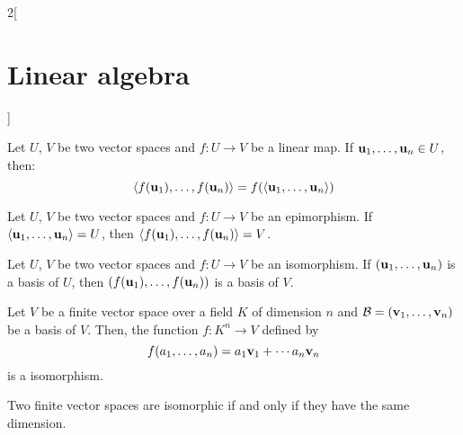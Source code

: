 \documentclass[../../../main.tex]{subfiles}
\begin{document}
\begin{multicols}{2}[\section{Linear algebra}]
\begin{proposition}
  \end{proposition}
  \begin{lemma}
    Let $U$, $V$ be two vector spaces and $f:U\rightarrow V$ be a linear map. If $\boldsymbol{\mathrm{u}}_1,\ldots,\boldsymbol{\mathrm{u}}_n\in U$, then: $$\langle f(\boldsymbol{\mathrm{u}}_1),\ldots,f(\boldsymbol{\mathrm{u}}_n)\rangle=f(\langle\boldsymbol{\mathrm{u}}_1,\ldots,\boldsymbol{\mathrm{u}}_n\rangle)$$
  \end{lemma}
  \begin{corollary}
    Let $U$, $V$ be two vector spaces and $f:U\rightarrow V$ be an epimorphism. If $\langle\boldsymbol{\mathrm{u}}_1,\ldots,\boldsymbol{\mathrm{u}}_n\rangle= U$, then $\langle f(\boldsymbol{\mathrm{u}}_1),\ldots,f(\boldsymbol{\mathrm{u}}_n)\rangle=V$.
  \end{corollary}
  \begin{corollary}
    Let $U$, $V$ be two vector spaces and $f:U\rightarrow V$ be an isomorphism. If $(\boldsymbol{\mathrm{u}}_1,\ldots,\boldsymbol{\mathrm{u}}_n)$ is a basis of $U$, then $(f(\boldsymbol{\mathrm{u}}_1),\ldots,f(\boldsymbol{\mathrm{u}}_n))$ is a basis of $V$.
  \end{corollary}
  \begin{theorem}
    Let $V$ be a finite vector space over a field $K$ of dimension $n$ and $\mathcal{B}=(\boldsymbol{\mathrm{v}}_1,\ldots,\boldsymbol{\mathrm{v}}_n)$ be a basis of $V$. Then, the function $f:K^n\rightarrow V$ defined by $$f(a_1,\ldots,a_n)=a_1\boldsymbol{\mathrm{v}}_1+\cdots a_n\boldsymbol{\mathrm{v}}_n$$ is a isomorphism.
  \end{theorem}
  \begin{corollary}
    Two finite vector spaces are isomorphic if and only if they have the same dimension.
  \end{corollary}

\end{multicols}
\end{document}
